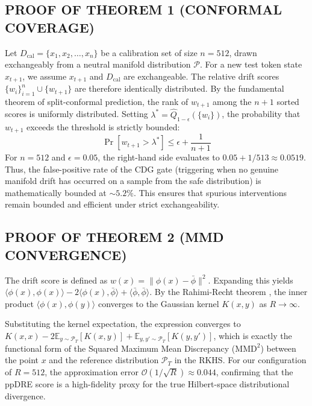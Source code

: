 \documentclass{ieeetmlcn}
\begin{document}
\subsection{PROOF OF THEOREM 1 (CONFORMAL COVERAGE)}
Let $D_{\text{cal}} = \{x_1, x_2, \dots, x_n\}$ be a calibration set of size $n=512$, drawn exchangeably from a neutral manifold distribution $\mathcal{P}$. For a new test token state $x_{t+1}$, we assume $x_{t+1}$ and $D_{\text{cal}}$ are exchangeable. The relative drift scores $\{w_i\}_{i=1}^n \cup \{w_{t+1}\}$ are therefore identically distributed.
By the fundamental theorem of split-conformal prediction, the rank of $w_{t+1}$ among the $n+1$ sorted scores is uniformly distributed. Setting $\lambda^* = \hat{Q}_{1-\epsilon}(\{w_i\})$, the probability that $w_{t+1}$ exceeds the threshold is strictly bounded:
\begin{equation}
\Pr[w_{t+1} > \lambda^*] \leq \epsilon + \frac{1}{n+1}
\end{equation}
For $n=512$ and $\epsilon=0.05$, the right-hand side evaluates to $0.05 + 1/513 \approx 0.0519$. Thus, the false-positive rate of the CDG gate (triggering when no genuine manifold drift has occurred on a sample from the safe distribution) is mathematically bounded at $\sim\!5.2\%$. This ensures that spurious interventions remain bounded and efficient under strict exchangeability.

\subsection{PROOF OF THEOREM 2 (MMD CONVERGENCE)}
The drift score is defined as $w(x) = \|\phi(x) - \bar{\phi}\|^2$. Expanding this yields $\langle \phi(x), \phi(x) \rangle - 2\langle \phi(x), \bar{\phi} \rangle + \langle \bar{\phi}, \bar{\phi} \rangle$. By the Rahimi-Recht theorem \cite{rahimi2007random}, the inner product $\langle \phi(x), \phi(y) \rangle$ converges to the Gaussian kernel $K(x, y)$ as $R \to \infty$. 

Substituting the kernel expectation, the expression converges to $K(x, x) - 2\mathbb{E}_{y \sim \mathcal{P}_T}[K(x, y)] + \mathbb{E}_{y, y' \sim \mathcal{P}_T}[K(y, y')]$, which is exactly the functional form of the Squared Maximum Mean Discrepancy ($\text{MMD}^2$) between the point $x$ and the reference distribution $\mathcal{P}_T$ in the RKHS. For our configuration of $R=512$, the approximation error $\mathcal{O}(1/\sqrt{R}) \approx 0.044$, confirming that the ppDRE score is a high-fidelity proxy for the true Hilbert-space distributional divergence.
\end{document}
